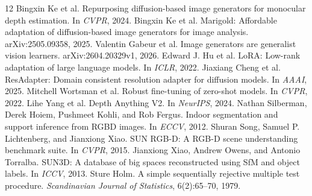 {\small\begin{thebibliography}{12}
 Bingxin Ke et al. Repurposing diffusion-based image generators for monocular depth estimation. In \emph{CVPR}, 2024.
 Bingxin Ke et al. Marigold: Affordable adaptation of diffusion-based image generators for image analysis. arXiv:2505.09358, 2025.
 Valentin Gabeur et al. Image generators are generalist vision learners. arXiv:2604.20329v1, 2026.
 Edward J. Hu et al. LoRA: Low-rank adaptation of large language models. In \emph{ICLR}, 2022.
 Jiaxiang Cheng et al. ResAdapter: Domain consistent resolution adapter for diffusion models. In \emph{AAAI}, 2025.
 Mitchell Wortsman et al. Robust fine-tuning of zero-shot models. In \emph{CVPR}, 2022.
 Lihe Yang et al. Depth Anything V2. In \emph{NeurIPS}, 2024.
 Nathan Silberman, Derek Hoiem, Pushmeet Kohli, and Rob Fergus. Indoor segmentation and support inference from RGBD images. In \emph{ECCV}, 2012.
 Shuran Song, Samuel P. Lichtenberg, and Jianxiong Xiao. SUN RGB-D: A RGB-D scene understanding benchmark suite. In \emph{CVPR}, 2015.
 Jianxiong Xiao, Andrew Owens, and Antonio Torralba. SUN3D: A database of big spaces reconstructed using SfM and object labels. In \emph{ICCV}, 2013.
 Sture Holm. A simple sequentially rejective multiple test procedure. \emph{Scandinavian Journal of Statistics}, 6(2):65--70, 1979.
\end{thebibliography}}

